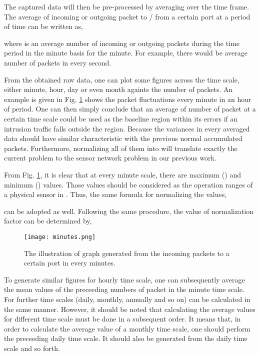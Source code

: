 \documentclass[conference,10pt,a4paper]{IEEEtran}
\begin{document}
The  captured data will then be pre-processed by averaging over the time frame. The average of incoming or outgoing packet to / from a certain port at a period of time  can be written as,

where  is an average number of incoming or outgoing packets during the time period in the minute basis for the  minute. 
For example, there would be  average number of packets in every second.

From the obtained raw data, one can plot some figures across the time scale, either minute, hour, day or even month againts the number of packets. An example is given in Fig. \ref{fig:minutes} shows the packet fluctuations every minute in an hour of period. One can then simply conclude that an average of number of packet at a certain time scale could be used as the baseline region within its errors if an intrusion traffic falls outside the region. Because the variances in every averaged data should have similar characteristic with the previous normal accumulated packets. Furthermore, normalizing all of them into  will translate exactly the current problem to the sensor network problem in our previous work. 

From Fig. \ref{fig:minutes}, it is clear that at every minute scale, there are maximum () and minimum () values. Those values should be considered as the operation ranges of a physical sensor in \cite{arya}. Thus, the same formula for normalizing the values,

can be adopted as well. Following the same procedure, the value of normalization factor  can be determined by,


\begin{figure}[t!]
 \centering
 \texttt{[image: minutes.png]}
\caption{The illustration of graph generated from the incoming packets to a certain port in every minutes.}
\label{fig:minutes}
\end{figure}

To generate similar figures for hourly time scale, one can subsequently average the mean values of the preceeding numbers of packet in the minute time scale. For further time scales (daily, monthly, annually and so on) can be calculated in the same manner. However, it should be noted that calculating the average values for different time scale must be done in a subsequent order. It means that, in order to calculate the average value of a monthly time scale, one should perform the preceeding daily time scale. It should also be generated from the daily time scale and so forth.
\end{document}
